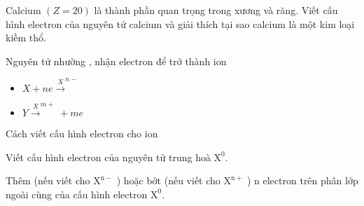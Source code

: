 \documentclass[Main.tex]{subfiles}
\begin{document}
\begin{vdex}
	Calcium $(Z=20)$ là thành phần quan trọng trong xương và răng. Viết cấu hình electron của nguyên tử calcium và giải thích tại sao calcium là một kim loại kiềm thổ.
\end{vdex}
	\begin{pp}
		Nguyên tử nhường , nhận electron để trở thành ion
		\begin{itemize}
			\item $X + ne \xrightarrow X^{n-}$
			\item $Y  \xrightarrow X^{m+} + me$
		\end{itemize}
		Cách viết cấu hình electron cho ion 
		\begin{cacbuoc}
			\item  Viết cấu hình electron của nguyên tử trung hoà $\mathrm{X}^0$.
			\item Thêm (nếu viết cho $\mathrm{X}^{\mathrm{n-}}$ ) hoặc bớt (nếu viết cho $\mathrm{X}^{\mathrm{n+}}$ ) n electron trên phân lớp ngoài cùng của cấu hình electron $\mathrm{X}^0$.
		\end{cacbuoc}
	\end{pp}
\end{document}
